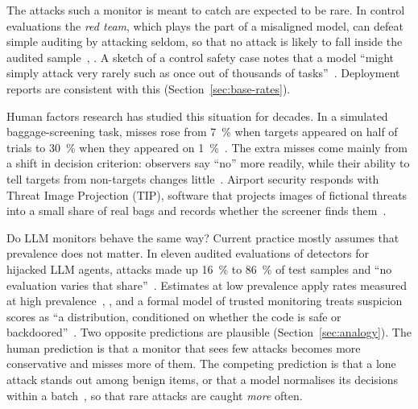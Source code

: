 \documentclass[11pt]{article}
\begin{document}
The attacks such a monitor is meant to catch are expected to be rare. In control evaluations the \emph{red team}, which plays the part of a misaligned model, can defeat simple auditing by attacking seldom, so that no attack is likely to fall inside the audited sample~\cite[Sec.~3.1]{greenblatt2024}, \cite[Sec.~3.1]{bhatt2025}. A sketch of a control safety case notes that a model ``might simply attack very rarely such as once out of thousands of tasks''~\cite[Sec.~6]{korbak2025}. Deployment reports are consistent with this (Section~\ref{sec:base-rates}).

Human factors research has studied this situation for decades. In a simulated baggage-screening task, misses rose from \SI{7}{\percent} when targets appeared on half of trials to \SI{30}{\percent} when they appeared on \SI{1}{\percent}~\cite{wolfe2005}. The extra misses come mainly from a shift in decision criterion: observers say ``no'' more readily, while their ability to tell targets from non-targets changes little~\cite{wolfe2007}. Airport security responds with Threat Image Projection (TIP), software that projects images of fictional threats into a small share of real bags and records whether the screener finds them~\cite{cutler2009,buser2025}.

Do LLM monitors behave the same way? Current practice mostly assumes that prevalence does not matter. In eleven audited evaluations of detectors for hijacked LLM agents, attacks made up \SI{16}{\percent} to \SI{86}{\percent} of test samples and ``no evaluation varies that share''~\cite[Abstract]{abbasi2026}. Estimates at low prevalence apply rates measured at high prevalence~\cite[Sec.~6.3]{srivastav2026}, \cite[Sec.~III.E]{abbasi2026}, and a formal model of trusted monitoring treats suspicion scores as ``a distribution, conditioned on whether the code is safe or backdoored''~\cite[Sec.~2]{griffin2024}. Two opposite predictions are plausible (Section~\ref{sec:analogy}). The human prediction is that a monitor that sees few attacks becomes more conservative and misses more of them. The competing prediction is that a lone attack stands out among benign items, or that a model normalises its decisions within a batch~\cite{hida2026}, so that rare attacks are caught \emph{more} often.
\end{document}
